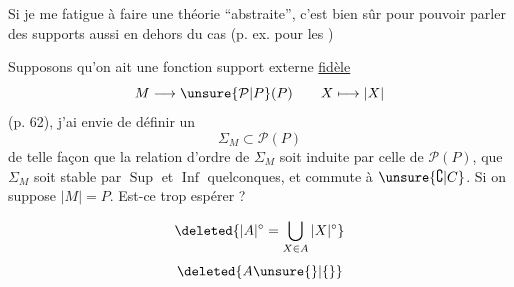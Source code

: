 
Si je me fatigue à faire une théorie ``abstraite'', c'est bien sûr pour pouvoir parler des supports aussi en dehors du cas  (p. ex. pour les  \unsure{\ldots})

Supposons qu'on ait une fonction support externe \uline{fidèle}
\[
 M\longrightarrow\unsure{\mathcal{P}|P}(P)\qquad X\longmapsto|X|
\]
(p. 62), j'ai envie  de définir un 
\[
 \Sigma_M\subset\mathcal{P}(P)
\]
de telle façon que la relation d'ordre de $\Sigma_M$ soit induite par celle de $\mathcal{P}(P)$, que $\Sigma_M$ soit stable par $\operatorname{Sup}$ et $\operatorname{Inf}$ quelconques, et commute à $\unsure{\complement|C}$. Si on suppose $|M|=P$. Est-ce trop espérer ?

\[
\deleted{|A|^{\circ}=\bigcup_{X\in A}|X|^{\circ}}
\]
\[
\deleted{A\unsure{\}|\{}}
\]
